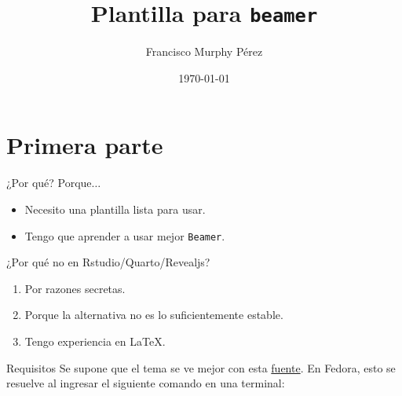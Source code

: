 \documentclass{beamer}
\title{Plantilla para \texttt{beamer}}
\date{\today}
\author{Francisco Murphy Pérez}
\institute{Instituto de Biotecnología - Universidad Nacional Autónoma de México}
\begin{document}
	\maketitle
	\section{Primera parte}
	\begin{frame}{¿Por qué?}
		Porque$\ldots$
		\begin{itemize}
			\item Necesito una plantilla lista para usar.
			\item Tengo que aprender a usar mejor \texttt{Beamer}.
		\end{itemize}
	\end{frame}
	\begin{frame}{¿Por qué no en Rstudio/Quarto/Revealjs?}
		\begin{enumerate}
			\item Por razones secretas.
			\item Porque la alternativa no es lo suficientemente estable.
			\item Tengo experiencia en \LaTeX{}.
		\end{enumerate}
	\end{frame}
	\begin{frame}[fragile]{Requisitos}
		Se supone que el tema se ve mejor con esta \href{https://mozilla.github.io/Fira/}{fuente}.
		En Fedora, esto se resuelve al ingresar el siguiente comando en una terminal:\\
		
	\end{frame}
\end{document}
